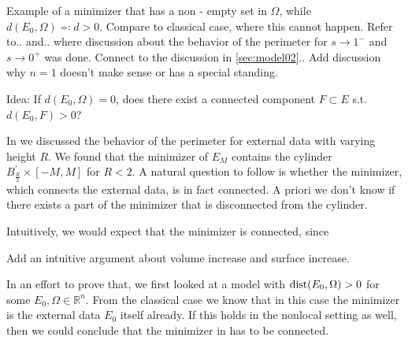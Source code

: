Example of a minimizer that has a non - empty set in \( \Omega \), while \( d(E_0, \Omega)
\eqqcolon d > 0 \).\newline
Compare to classical case, where this cannot happen. Refer to.. and.. where discussion
about the behavior of the perimeter for \( s \to 1^ - \) and \( s \to 0^ + \) was done.
\newline
Connect to the discussion in \cref{sec:model02}..\newline
Add discussion why \( n = 1 \) doesn't make sense or has a special standing.\newline

Idea: If \( d(E_0, \Omega) = 0 \), does there exist a connected component \( F \subset E
\) s.t.\ \( d(E_0, F) > 0 \)?\newline

In  we discussed the behavior of the perimeter for external data with
varying height \( R \). We found that the minimizer of \( E_M \) contains the cylinder \(
B^\prime_{\frac{R}{2}} \times [- M, M] \) for \( R < 2 \). A natural question to follow is
whether the minimizer, which connects the external data, is in fact connected. A priori we
don't know if there exists a part of the minimizer that is disconnected from the
cylinder.\newline

Intuitively, we would expect that the minimizer is connected, since
\begin{TODO}
	Add an intuitive argument about volume increase and surface increase.
\end{TODO}

In an effort to prove that, we first looked at a model with \( \operatorname{dist}(E_0, \Omega) > 0 \)
for some \( E_0, \Omega \in \mathbb{R}^n \). From the classical case we know that in this
case the minimizer is the external data \( E_0 \) itself already. If this holds in the
nonlocal setting as well, then we could conclude that the minimizer in  has
to be connected.


